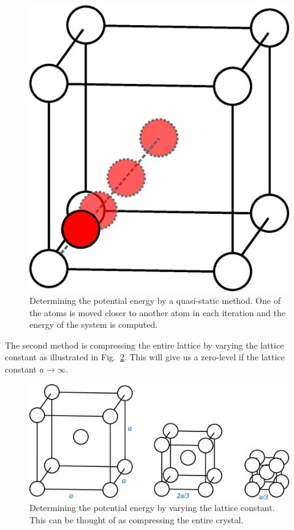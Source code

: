 \documentclass{article}
\begin{document}
\begin{figure}[H]
  \centering
  \includegraphics[scale=0.5]{img/quasi-stat-pot2.eps}
  \caption{Determining the potential energy by a quasi-static method. One of the atoms is moved closer to another atom in each iteration and the energy of the system is computed.}
  \label{fig:quasi-stat-pot}
\end{figure}

The second method is compressing the entire lattice by varying the lattice constant as illustrated in Fig.~\ref{fig:compr-pot}. This will give us a zero-level if the lattice constant $a \rightarrow \infty$.

\begin{figure}[H]
  \centering
  \includegraphics[scale=0.4]{img/compr-pot3.eps}
  \caption{Determining the potential energy by varying the lattice constant. This can be thought of as compressing the entire crystal.}
  \label{fig:compr-pot}
\end{figure}
\end{document}
